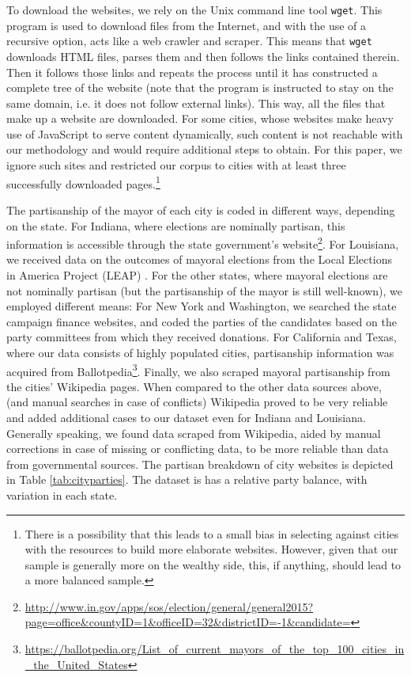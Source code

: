 \documentclass[11pt]{article}
\begin{document}
To download the websites, we rely on the Unix command line tool \texttt{wget}. This program is used to download files from the Internet, and with the use of a recursive option, acts like a web crawler and scraper. This means that \texttt{wget} downloads HTML files, parses them and then follows the links contained therein. Then it follows those links and repeats the process until it has constructed a complete tree of the website (note that the program is instructed to stay on the same domain, i.e. it does not follow external links). This way, all the files that make up a website are downloaded. For some cities, whose websites make heavy use of JavaScript to serve content dynamically, such content is not reachable with our methodology and would require additional steps to obtain. For this paper, we ignore such sites and restricted our corpus to cities with at least three successfully downloaded pages.\footnote{There is a possibility that this leads to a small bias in selecting against cities with the resources to build more elaborate websites. However, given that our sample is generally more on the wealthy side, this, if anything, should lead to a more balanced sample.}

The partisanship of the mayor of each city is coded in different ways, depending on the state. For Indiana, where elections are nominally partisan, this information is accessible through the state government's website\footnote{\url{http://www.in.gov/apps/sos/election/general/general2015?page=office&countyID=1&officeID=32&districtID=-1&candidate=}}. For Louisiana, we received data on the outcomes of mayoral elections from the Local Elections in America Project (LEAP) \citep{marschall2013local}. For the other states, where mayoral elections are not nominally partisan (but the partisanship of the mayor is still well-known), we employed different means: For New York and Washington, we searched the state campaign finance websites, and coded the parties of the candidates based on the party committees from which they received donations. For California and Texas, where our data consists of highly populated cities, partisanship information was acquired from Ballotpedia\footnote{\url{https://ballotpedia.org/List_of_current_mayors_of_the_top_100_cities_in_the_United_States}}. Finally, we also scraped mayoral partisanship from the cities' Wikipedia pages. When compared to the other data sources above, (and manual searches in case of conflicts) Wikipedia proved to be very reliable and added additional cases to our dataset even for Indiana and Louisiana. Generally speaking, we found data scraped from Wikipedia, aided by manual corrections in case of missing or conflicting data, to be more reliable than data from governmental sources. The partisan breakdown of city websites is depicted in Table \ref{tab:cityparties}. The dataset is has a relative party balance, with variation in each state.
\end{document}
